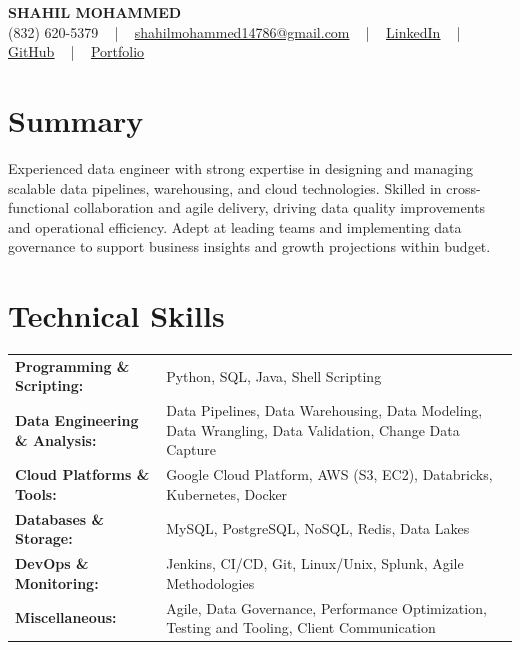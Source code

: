 \documentclass[letterpaper,11pt]{article}
\begin{document}
\begin{center}
    {\fontsize{14pt}{12pt}\selectfont \textbf{\MakeUppercase{Shahil Mohammed}}}\\ \vspace{2pt}
    \fontsize{10pt}{12pt}\selectfont (832) 620-5379 ~ | ~ \href{mailto:shahilmohammed14786@gmail.com}{shahilmohammed14786@gmail.com} ~ | ~  
    \href{https://www.linkedin.com/in/shahil-mohammed-9652931a1/}{\color{blue}\underline{LinkedIn}}  ~ | ~ 
    \href{https://github.com/freakbeast14}{\color{blue}\underline{GitHub}} ~ | ~ 
    \href{https://shahil-mohammed.netlify.app/}{\color{blue}\underline{Portfolio}}
    \vspace{-8pt}
\end{center}

\section{Summary}
\fontsize{9pt}{10pt}\selectfont
Experienced data engineer with strong expertise in designing and managing scalable data pipelines, warehousing, and cloud technologies. Skilled in cross-functional collaboration and agile delivery, driving data quality improvements and operational efficiency. Adept at leading teams and implementing data governance to support business insights and growth projections within budget.
 \vspace{-5pt}
 
\section{Technical Skills}
        \vspace{-14pt}
        \begin{table}[h]
            \fontsize{9pt}{10pt}\selectfont
            \begin{tabular}{p{0.3\linewidth} p{0.7\linewidth}}
                \textbf{Programming \& Scripting:} & Python, SQL, Java, Shell Scripting \\
                \textbf{Data Engineering \& Analysis:} & Data Pipelines, Data Warehousing, Data Modeling, Data Wrangling, Data Validation, Change Data Capture \\
                \textbf{Cloud Platforms \& Tools:} & Google Cloud Platform, AWS (S3, EC2), Databricks, Kubernetes, Docker \\
                \textbf{Databases \& Storage:} & MySQL, PostgreSQL, NoSQL, Redis, Data Lakes \\
                \textbf{DevOps \& Monitoring:} & Jenkins, CI/CD, Git, Linux/Unix, Splunk, Agile Methodologies \\
                \textbf{Miscellaneous:} & Agile, Data Governance, Performance Optimization, Testing and Tooling, Client Communication \\
            \end{tabular}
        \end{table}
 \vspace{-15pt}
 
\end{document}
